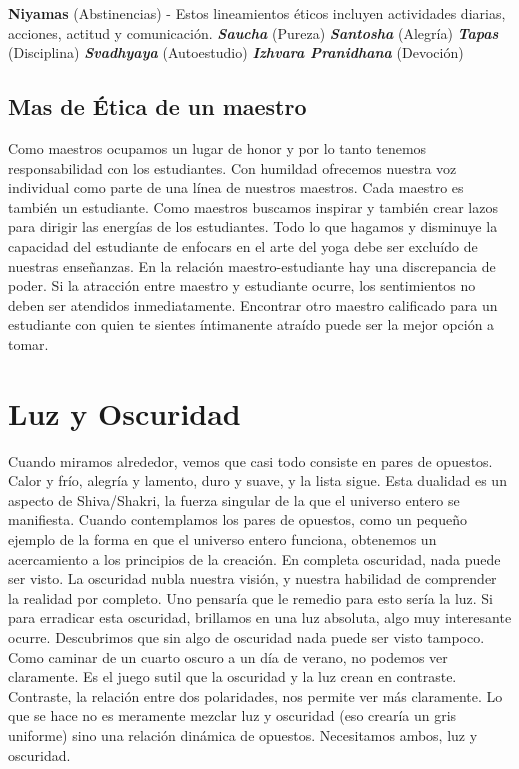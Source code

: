 \begin{itemize}
\textbf{Niyamas} (Abstinencias) - Estos lineamientos \'eticos incluyen actividades diarias, acciones, actitud y comunicación.
\textbf{\textit{Saucha}} (Pureza)
\textbf{\textit{Santosha}} (Alegría)
\textbf{\textit{Tapas}} (Disciplina)
\textbf{\textit{Svadhyaya}} (Autoestudio)
\textbf{\textit{Izhvara Pranidhana}} (Devoción)

\subsection{Mas de Ética de un maestro}
Como maestros ocupamos un lugar de honor y por lo tanto tenemos responsabilidad con los estudiantes. Con humildad ofrecemos nuestra voz individual como parte de una línea de nuestros maestros. Cada maestro es tambi\'en un estudiante. Como maestros buscamos inspirar y tambi\'en crear lazos para dirigir las energías de los estudiantes. Todo lo que hagamos y disminuye la capacidad del estudiante de enfocars en el arte del yoga debe ser excluído de nuestras enseñanzas. En la relación maestro-estudiante hay una discrepancia de poder. Si la atracción entre maestro y estudiante ocurre, los sentimientos no deben ser atendidos inmediatamente. Encontrar otro maestro calificado para un estudiante con quien te sientes íntimanente atraído puede ser la mejor opción a tomar.

\section{Luz y Oscuridad}
Cuando miramos alrededor, vemos que casi todo consiste en pares de opuestos. Calor y frío, alegría y lamento, duro y suave, y la lista sigue. Esta dualidad es un aspecto de Shiva/Shakri, la fuerza singular de la que el universo entero se manifiesta. Cuando contemplamos los pares de opuestos, como un pequeño ejemplo de la forma en que el universo entero funciona, obtenemos un acercamiento a los principios de la creación. En completa oscuridad, nada puede ser visto. La oscuridad nubla nuestra visión, y nuestra habilidad de comprender la realidad por completo. Uno pensaría que le remedio para esto sería la luz. Si para erradicar esta oscuridad, brillamos en una luz absoluta, algo muy interesante ocurre. Descubrimos que sin algo de oscuridad nada puede ser visto tampoco. Como caminar de un cuarto oscuro a un día de verano, no podemos ver claramente. Es el juego sutil que la oscuridad y la luz crean en contraste. Contraste, la relación entre dos polaridades, nos permite ver más claramente. Lo que se hace no es meramente mezclar luz y oscuridad (eso crearía un gris uniforme) sino una relación dinámica de opuestos. Necesitamos ambos, luz y oscuridad.


\end{itemize}
